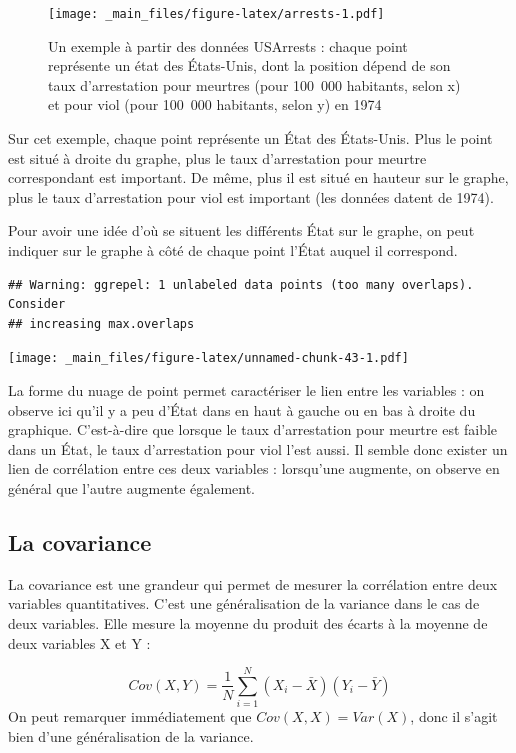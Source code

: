 \documentclass[
]{book}
\begin{document}
\begin{figure}
\centering
\texttt{[image: \_main\_files/figure-latex/arrests-1.pdf]}
\caption{\label{fig:arrests}Un exemple à partir des données USArrests : chaque point représente un état des États-Unis, dont la position dépend de son taux d'arrestation pour meurtres (pour 100~000 habitants, selon x) et pour viol (pour 100~000 habitants, selon y) en 1974}
\end{figure}

Sur cet exemple, chaque point représente un État des États-Unis. Plus le
point est situé à droite du graphe, plus le taux d'arrestation pour
meurtre correspondant est important. De même, plus il est situé en hauteur sur le graphe, plus le taux d'arrestation pour viol est important (les données
datent de 1974).

Pour avoir une idée d'où se situent les différents État sur le graphe,
on peut indiquer sur le graphe à côté de chaque point l'État auquel il
correspond.

\begin{verbatim}
## Warning: ggrepel: 1 unlabeled data points (too many overlaps). Consider
## increasing max.overlaps
\end{verbatim}

\texttt{[image: \_main\_files/figure-latex/unnamed-chunk-43-1.pdf]}

La forme du nuage de point permet caractériser le lien entre les
variables : on observe ici qu'il y a peu d'État dans en haut à gauche ou
en bas à droite du graphique. C'est-à-dire que lorsque le taux
d'arrestation pour meurtre est faible dans un État, le taux
d'arrestation pour viol l'est aussi. Il semble donc exister un lien de
corrélation entre ces deux variables : lorsqu'une augmente, on observe
en général que l'autre augmente également.

\hypertarget{la-covariance}{%
\subsection{La covariance}\label{la-covariance}}

La covariance est une grandeur qui permet de mesurer la corrélation
entre deux variables quantitatives. C'est une généralisation de la
variance dans le cas de deux variables. Elle mesure la moyenne du
produit des écarts à la moyenne de deux variables X et Y :

\[ Cov(X, Y) = \frac{1}{N} \sum^N_{i = 1}(X_i - \bar{X})(Y_i - \bar{Y})\]
On peut remarquer immédiatement que \(Cov(X,X) = Var(X)\), donc il s'agit
bien d'une généralisation de la variance.
\end{document}
